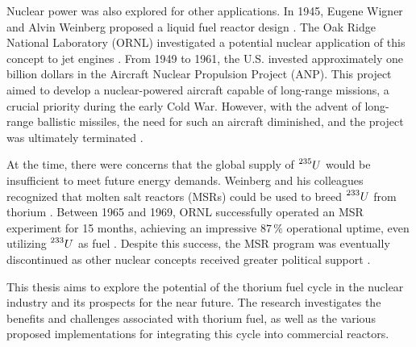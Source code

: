 Nuclear power was also explored for other applications. In 1945, Eugene Wigner and Alvin Weinberg proposed a liquid fuel reactor design \cite{TMSR_book}. The Oak Ridge National Laboratory (ORNL) investigated a potential nuclear application of this concept to jet engines \cite{TMSR_book}. From 1949 to 1961, the U.S. invested approximately one billion dollars in the Aircraft Nuclear Propulsion Project (ANP). This project aimed to develop a nuclear-powered aircraft capable of long-range missions, a crucial priority during the early Cold War. However, with the advent of long-range ballistic missiles, the need for such an aircraft diminished, and the project was ultimately terminated \cite{Lamarsh_Baratta_2009}.

At the time, there were concerns that the global supply of \(\prescript{235}{}{U}\) would be insufficient to meet future energy demands. Weinberg and his colleagues recognized that molten salt reactors (MSRs) could be used to breed \(\prescript{233}{}{U}\) from thorium \cite{TMSR_book}. Between 1965 and 1969, ORNL successfully operated an MSR experiment for 15 months, achieving an impressive \(87 \, \%\) operational uptime, even utilizing \(\prescript{233}{}{U}\) as fuel \cite{TMSR_book}. Despite this success, the MSR program was eventually discontinued as other nuclear concepts received greater political support \cite{TMSR_book}.

This thesis aims to explore the potential of the thorium fuel cycle in the nuclear industry and its prospects for the near future. The research investigates the benefits and challenges associated with thorium fuel, as well as the various proposed implementations for integrating this cycle into commercial reactors.


